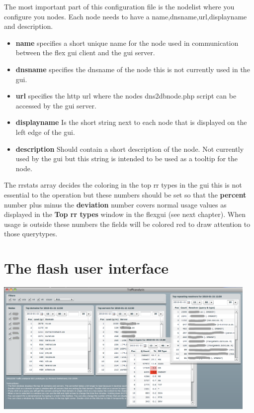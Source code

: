 \documentclass[a4paper]{article}
\begin{document}
The most important part of this configuration file is the nodelist where you configure you nodes.
Each node needs to have a name,dnsname,url,displayname and description.
\begin{itemize}
\item \textbf{name} specifies a short unique name for the node used in communication between the flex gui client and the gui server.
\item \textbf{dnsname} specifies the dnsname of the node this is not currently used in the gui.
\item \textbf{url} specifies the http url where the nodes dns2dbnode.php script can be accessed by the gui server.
\item \textbf{displayname} Is the short string next to each node that is displayed on the left edge of the gui.
\item \textbf{description} Should contain a short description of the node. Not currently used by the gui but this string is intended to be used as a tooltip for the node.
\end{itemize}

The rrstats array decides the coloring in the top rr types in the gui 
this is not essential to the operation but these numbers should be set so that 
the \textbf{percent} number  plus minus the \textbf{deviation}
number covers normal usage values as displayed in the \textbf{Top rr types} window in the flexgui (see next chapter). When usage is outside these numbers the fields will be colored red to draw attention to those querytypes.





\newpage
\section{The flash user interface}
\includegraphics[width=5.0in]{../screendumps/1.png}
\end{document}
